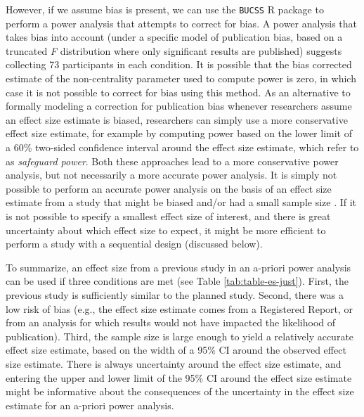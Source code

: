 \documentclass[
  oneside]{book}
\begin{document}
However, if we assume bias is present, we can use the \texttt{BUCSS} R package \citep{anderson_sample-size_2017} to perform a power analysis that attempts to correct for bias. A power analysis that takes bias into account (under a specific model of publication bias, based on a truncated \emph{F} distribution where only significant results are published) suggests collecting 73 participants in each condition. It is possible that the bias corrected estimate of the non-centrality parameter used to compute power is zero, in which case it is not possible to correct for bias using this method. As an alternative to formally modeling a correction for publication bias whenever researchers assume an effect size estimate is biased, researchers can simply use a more conservative effect size estimate, for example by computing power based on the lower limit of a 60\% two-sided confidence interval around the effect size estimate, which \citet{perugini_safeguard_2014} refer to as \emph{safeguard power}. Both these approaches lead to a more conservative power analysis, but not necessarily a more accurate power analysis. It is simply not possible to perform an accurate power analysis on the basis of an effect size estimate from a study that might be biased and/or had a small sample size \citep{teare_sample_2014}. If it is not possible to specify a smallest effect size of interest, and there is great uncertainty about which effect size to expect, it might be more efficient to perform a study with a sequential design (discussed below).

To summarize, an effect size from a previous study in an a-priori power analysis can be used if three conditions are met (see Table \ref{tab:table-es-just}). First, the previous study is sufficiently similar to the planned study. Second, there was a low risk of bias (e.g., the effect size estimate comes from a Registered Report, or from an analysis for which results would not have impacted the likelihood of publication). Third, the sample size is large enough to yield a relatively accurate effect size estimate, based on the width of a 95\% CI around the observed effect size estimate. There is always uncertainty around the effect size estimate, and entering the upper and lower limit of the 95\% CI around the effect size estimate might be informative about the consequences of the uncertainty in the effect size estimate for an a-priori power analysis.
\end{document}
